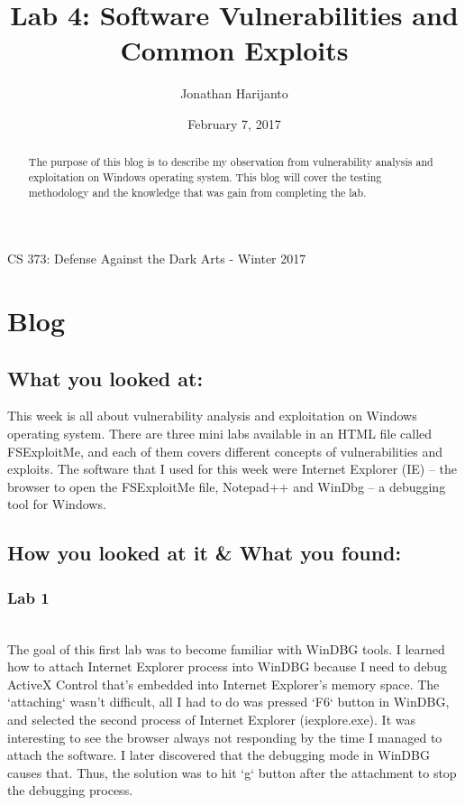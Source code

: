 \documentclass[letterpaper,10pt,titlepage,draftclsnofoot,onecolumn]{IEEEtran}
\title{Lab 4: Software Vulnerabilities and Common Exploits}
\author{Jonathan Harijanto}
\date{February 7, 2017}
\begin{document}
\maketitle
\begin{center}
CS 373: Defense Against the Dark Arts - Winter 2017
\vfill
\end{center}
\begin{abstract}
The purpose of this blog is to describe my observation from vulnerability analysis and exploitation on Windows operating system. 
This blog will cover the testing methodology and the knowledge that was gain from completing the lab.

\end{abstract}
\newpage

\section{Blog} 

\subsection{What you looked at:}
This week is all about vulnerability analysis and exploitation on Windows operating system.
There are three mini labs available in an HTML file called FSExploitMe, and each of them covers different concepts of vulnerabilities and exploits.
The software that I used for this week were Internet Explorer (IE) -- the browser to open the FSExploitMe file, Notepad++ and WinDbg -- a debugging tool for Windows.

\subsection{How you looked at it \& What you found:}

\subsubsection{Lab 1}
\hfill\\
The goal of this first lab was to become familiar with WinDBG tools. 
I learned how to attach Internet Explorer process into WinDBG because I need to debug ActiveX Control that's embedded into Internet Explorer's memory space.
The `attaching` wasn't difficult, all I had to do was pressed `F6` button in WinDBG, and selected the second process of Internet Explorer (iexplore.exe). 
It was interesting to see the browser always not responding by the time I managed to attach the software.
I later discovered that the debugging mode in WinDBG causes that.
Thus, the solution was to hit `g` button after the attachment to stop the debugging process.
\end{document}

